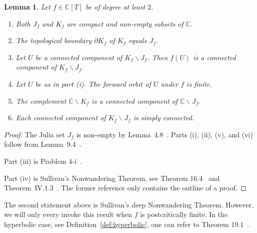 \documentclass[12pt,oneside,a4]{amsart}
\newcommand{\IC}{\mathbb{C}}
\newcounter{maincounter}
\numberwithin{maincounter}{section}
\numberwithin{equation}{section}
\newtheorem{lemma}[maincounter]{Lemma}
\newcommand{\ssm}{\smallsetminus}
\begin{document}
\begin{lemma}
  \label{lem:fatoucomponents}
  Let $f\in\IC[T]$ be of degree at least  $2$.
  \begin{enumerate}
  \item[(i)] Both $J_f$ and $K_f$ are compact and non-empty subsets
    of $\IC$. 
  \item[(ii)] The topological boundary $\partial K_f$ of $K_f$ equals
    $J_f$. 
  \item [(iii)]   Let $U$ be a connected component of $K_f\ssm J_f$.
    Then $f(U)$ is a connected component of $K_f\ssm J_f$.    
  \item[(iv)] Let $U$ be as in part (i). The forward orbit of $U$
    under $f$  is
    finite.   
  \item[(v)] The complement $\IC\ssm K_f$ is a connected component
    of $\IC\ssm J_f$. 
  \item[(vi)] Each connected component of $K_f\ssm J_f$ is simply
    connected.  
  \end{enumerate}
\end{lemma}
\begin{proof}
  The Julia set $J_f$ is non-empty by Lemma~4.8~\cite{Milnor}.
  Parts (i), (ii), (v), and (vi) follow from  Lemma~9.4~\cite{Milnor}.

  Part (iii) is Problem 4-i~\cite{Milnor}.

  Part (iv) is Sullivan's Nonwandering Theorem, see Theorem
  16.4~\cite{Milnor} and Theorem~IV.1.3~\cite{CarlesonGamelin}. The
  former reference only contains the outline of a proof.   
\end{proof}

The second statement above is Sullivan's deep Nonwandering Theorem.
However, we will only every invoke this result when $f$ is
postcritically finite. In the hyperbolic case,
see Definition~\ref{def:hyperbolic}, one can refer to
Theorem 19.1~\cite{Milnor}.
\end{document}
